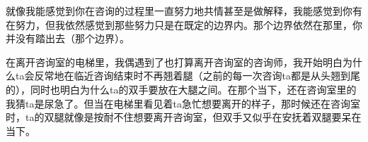 {{		就像我能感觉到你在咨询的过程里一直努力地共情甚至是做解释，我能感觉到你有在努力，但我依然感觉到那些努力只是在既定的边界内。那个边界依然在那里，你并没有踏出去（那个边界）。}
}

在离开咨询室的电梯里，我偶遇到了也打算离开咨询室的咨询师，我开始明白为什么ta会反常地在临近咨询结束时不再翘着腿（之前的每一次咨询ta都是从头翘到尾的），同时也明白为什么ta的双手要放在大腿之间。在那个当下，还在咨询室里的我猜ta是尿急了。但当在电梯里看见着ta急忙想要离开的样子，那时候还在咨询室时，ta的双腿就像是按耐不住想要离开咨询室，但双手又似乎在安抚着双腿\pozhehao{}要呆在当下。

